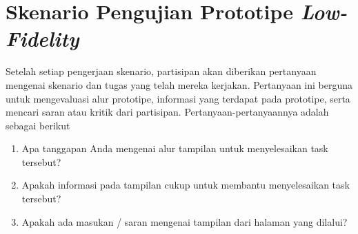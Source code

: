 \chapter{Skenario Pengujian Prototipe \textit{Low-Fidelity}}
\label{chpt:skenario_lofi}

Setelah setiap pengerjaan skenario, partisipan akan diberikan pertanyaan mengenai skenario dan tugas yang telah mereka kerjakan. Pertanyaan ini berguna untuk mengevaluasi alur prototipe, informasi yang terdapat pada prototipe, serta mencari saran atau kritik dari partisipan. Pertanyaan-pertanyaannya adalah sebagai berikut

\begin{enumerate}
  \item Apa tanggapan Anda mengenai alur tampilan untuk menyelesaikan task tersebut?
  \item Apakah informasi pada tampilan cukup untuk membantu menyelesaikan task tersebut?
  \item Apakah ada masukan / saran mengenai tampilan dari halaman yang dilalui?
\end{enumerate}

